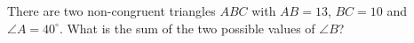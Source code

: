 There are two non-congruent triangles $ABC$ with $AB=13$, $BC=10$ and $\angle A=40^\circ$. What is the sum of the two possible values of $\angle B$?
